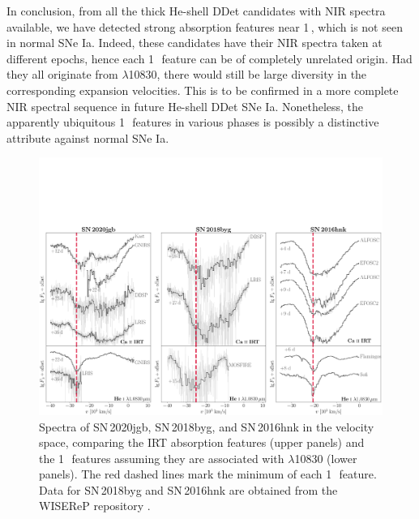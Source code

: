 \documentclass[twocolumn]{aastex631}
\newcommand{\sn}{SN\,2020jgb}
\begin{document}
In conclusion, from all the thick He-shell DDet candidates with NIR spectra available, we have detected strong absorption features near 1\,\micron, which is not seen in normal SNe Ia. Indeed, these candidates have their NIR spectra taken at different epochs, hence each 1\,\micron\ feature can be of completely unrelated origin. Had they all originate from  $\lambda$10830, there would still be large diversity in the corresponding expansion velocities. This is to be confirmed in a more complete NIR spectral sequence in future He-shell DDet SNe Ia. Nonetheless, the apparently ubiquitous 1\,\micron\ features in various phases is possibly a distinctive attribute against normal SNe Ia.

\begin{figure}
    \centering
    \includegraphics[width=\textwidth]{CaII_HeI_hvf.pdf}
    \caption{Spectra of \sn, SN\,2018byg, and SN\,2016hnk in the velocity space, comparing the  IRT absorption features (upper panels) and the 1\,\micron\ features assuming they are associated with  $\lambda$10830 (lower panels). The red dashed lines mark the minimum of each 1\,\micron\ feature. Data for SN\,2018byg and SN\,2016hnk are obtained from the WISEReP repository \citep{wiserep_2012}.}
    \label{fig:hvf_comp}
\end{figure}
\end{document}
